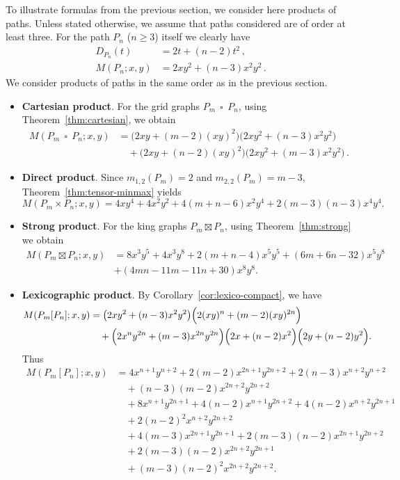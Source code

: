 \documentclass[letterpaper,12pt]{article}
\DeclareMathOperator{\cp}{\,\square\,}
\begin{document}
To illustrate formulas from the previous section, we consider here products of paths. Unless stated otherwise, we assume that paths considered are of order at least three. For the path $P_n$ ($n\ge 3$) itself we clearly have 
\begin{align*}
D_{P_n}(t) & = 2t+(n-2)t^2\,, \\
M(P_n;x,y) & = 2xy^2+(n-3)x^2y^2\,.
\end{align*}
We consider products of paths in the same order as in the previous section. 
\begin{itemize}

\item\textbf{Cartesian product}. For the grid graphs $P_m\cp P_n$, using Theorem~\ref{thm:cartesian}, we obtain 
\[
\begin{aligned}
M(P_m\cp P_n;x,y)
&=
\bigl(2xy+(m-2)(xy)^2\bigr)\bigl(2xy^2+(n-3)x^2y^2\bigr)\\
&\quad+
\bigl(2xy+(n-2)(xy)^2\bigr)\bigl(2xy^2+(m-3)x^2y^2\bigr)\,.
\end{aligned}
\] 

\item\textbf{Direct product}. Since $m_{1,2}(P_m)=2$ and $m_{2,2}(P_m)=m-3$, 
Theorem~\ref{thm:tensor-minmax} yields
\[
M(P_m\times P_n;x,y)
=
4x y^{4}
+
4x^{2}y^{2}
+
4(m+n-6)x^{2}y^{4}
+
2(m-3)(n-3)x^{4}y^{4}.
\]

\item\textbf{Strong product}. For the king graphs $P_m\boxtimes P_n$, using Theorem~\ref{thm:strong} we obtain 
\[
\begin{aligned}
M(P_m\boxtimes P_n;x,y)
&=
8x^3y^5
+
4x^3y^8
+
2(m+n-4)x^5y^5+
(6m+6n-32)x^5y^8 \\
& 
+
(4mn-11m-11n+30)x^8y^8.
\end{aligned}
\]

\item\textbf{Lexicographic product}. By Corollary~\ref{cor:lexico-compact}, we have  
\[
\begin{aligned}
M(P_m[P_n];x,y)
&=\bigl(2xy^2+(n-3)x^2y^2\bigr)\Bigl(2(xy)^n+(m-2)(xy)^{2n}\Bigr)\\
&\quad+\Bigl(2x^ny^{2n}+(m-3)x^{2n}y^{2n}\Bigr)\Bigl(2x+(n-2)x^2\Bigr)\Bigl(2y+(n-2)y^2\Bigr).
\end{aligned}
\]
Thus
\[
\begin{aligned}
M(P_m[P_n];x,y)
&=4x^{n+1}y^{n+2}
+2(m-2)x^{2n+1}y^{2n+2}
+2(n-3)x^{n+2}y^{n+2} \\
&\quad
+(n-3)(m-2)x^{2n+2}y^{2n+2} \\
&\quad
+8x^{n+1}y^{2n+1}
+4(n-2)x^{n+1}y^{2n+2}
+4(n-2)x^{n+2}y^{2n+1} \\
&\quad
+2(n-2)^2x^{n+2}y^{2n+2} \\
&\quad
+4(m-3)x^{2n+1}y^{2n+1}
+2(m-3)(n-2)x^{2n+1}y^{2n+2} \\
&\quad
+2(m-3)(n-2)x^{2n+2}y^{2n+1} \\
&\quad
+(m-3)(n-2)^2x^{2n+2}y^{2n+2}.
\end{aligned}
\]


\end{itemize}
\end{document}
